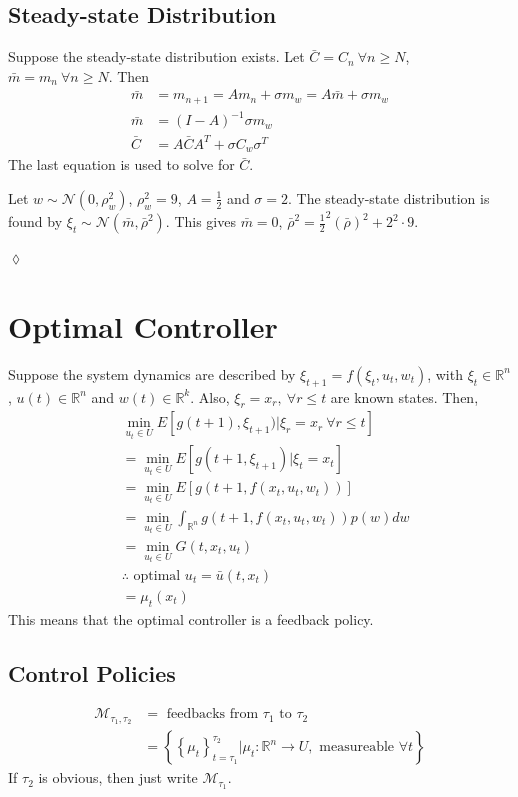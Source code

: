 \documentclass[lecture,12pt,]{pcms-l}
\begin{document}
\subsection{Steady-state Distribution}
Suppose the steady-state distribution exists. Let $\bar{C} = C_n ~\forall n\geq N$, $\bar{m} = m_n ~\forall n\geq N$. Then
\begin{align*}
\bar{m} &= m_{n+1} = Am_n + \sigma m_w = A\bar{m} + \sigma m_w \\
\bar{m} &= (I-A)^{-1}\sigma m_w \\
\bar{C} &= A\bar{C}A^T + \sigma C_w\sigma^T
\end{align*}
The last equation is used to solve for $\bar{C}$.

\begin{example}
Let $w\sim\mathcal{N}(0,\rho_w^2)$, $\rho_w^2=9$, $A=\frac{1}{2}$ and $\sigma=2$. The steady-state distribution is found by $\xi_t \sim\mathcal{N}(\bar{m}, \bar{\rho}^2)$. This gives $\bar{m}=0$, $\bar{\rho}^2 = \frac{1}{2}^2(\bar{\rho})^2 + 2^2\cdot 9$.
\end{example}
$\lozenge$

\section{Optimal Controller}
Suppose the system dynamics are described by $\xi_{t+1} = f(\xi_t,u_t,w_t)$, with $\xi_t\in\mathbb{R}^n$, $u(t)\in\mathbb{R}^n$ and $w(t)\in\mathbb{R}^k$. Also, $\xi_r=x_r, ~\forall r\leq t$ are known states. Then,
\begin{align*}
&\min_{u_t\in U} E[g(t+1),\xi_{t+1}) | \xi_r=x_r ~\forall r\leq t] \\
&= \min_{u_t\in U} E[g(t+1,\xi_{t+1}) | \xi_t=x_t] \\
&= \min_{u_t\in U} E[g(t+1, f(x_t,u_t,w_t))] \\
&= \min_{u_t\in U} \int_{\mathbb{R}^n} g(t+1,f(x_t,u_t,w_t))p(w)dw \\
&= \min_{u_t\in U} G(t,x_t,u_t) \\
&\therefore \text{ optimal } u_t=\bar{u}(t,x_t) \\
&= \mu_t(x_t)
\end{align*}
This means that the optimal controller is a feedback policy.

\subsection{Control Policies}
\begin{align*}
\mathcal{M}_{\tau_1,\tau_2} &= \text{ feedbacks from } \tau_1 \text{ to } \tau_2 \\
&= \left\lbrace\left\lbrace\mu_t\right\rbrace_{t=\tau_1}^{\tau_2} | \mu_t: \mathbb{R}^n \to U, \text{ measureable } \forall t\right\rbrace
\end{align*}
If $\tau_2$ is obvious, then just write $\mathcal{M}_{\tau_1}$.
\end{document}
